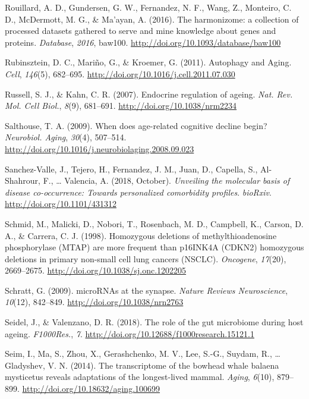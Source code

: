 \documentclass[12pt,twoside]{unicam}
\begin{document}
\begin{cslreferences}
\leavevmode\hypertarget{ref-Rouillard2016}{}%
Rouillard, A. D., Gundersen, G. W., Fernandez, N. F., Wang, Z., Monteiro, C. D., McDermott, M. G., \& Ma'ayan, A. (2016). The harmonizome: a collection of processed datasets gathered to serve and mine knowledge about genes and proteins. \emph{Database}, \emph{2016}, baw100. \url{http://doi.org/10.1093/database/baw100}

\leavevmode\hypertarget{ref-Rubinsztein2011}{}%
Rubinsztein, D. C., Mariño, G., \& Kroemer, G. (2011). Autophagy and Aging. \emph{Cell}, \emph{146}(5), 682--695. \url{http://doi.org/10.1016/j.cell.2011.07.030}

\leavevmode\hypertarget{ref-Russell2007}{}%
Russell, S. J., \& Kahn, C. R. (2007). Endocrine regulation of ageing. \emph{Nat. Rev. Mol. Cell Biol.}, \emph{8}(9), 681--691. \url{http://doi.org/10.1038/nrm2234}

\leavevmode\hypertarget{ref-Salthouse2009}{}%
Salthouse, T. A. (2009). When does age-related cognitive decline begin? \emph{Neurobiol. Aging}, \emph{30}(4), 507--514. \url{http://doi.org/10.1016/j.neurobiolaging.2008.09.023}

\leavevmode\hypertarget{ref-Sanchez-Valle2018}{}%
Sanchez-Valle, J., Tejero, H., Fernandez, J. M., Juan, D., Capella, S., Al-Shahrour, F., \ldots{} Valencia, A. (2018, October). \emph{Unveiling the molecular basis of disease co-occurrence: Towards personalized comorbidity profiles}. \emph{bioRxiv}. \url{http://doi.org/10.1101/431312}

\leavevmode\hypertarget{ref-Schmid1998}{}%
Schmid, M., Malicki, D., Nobori, T., Rosenbach, M. D., Campbell, K., Carson, D. A., \& Carrera, C. J. (1998). Homozygous deletions of methylthioadenosine phosphorylase (MTAP) are more frequent than p16INK4A (CDKN2) homozygous deletions in primary non-small cell lung cancers (NSCLC). \emph{Oncogene}, \emph{17}(20), 2669--2675. \url{http://doi.org/10.1038/sj.onc.1202205}

\leavevmode\hypertarget{ref-Schratt2009}{}%
Schratt, G. (2009). microRNAs at the synapse. \emph{Nature Reviews Neuroscience}, \emph{10}(12), 842--849. \url{http://doi.org/10.1038/nrn2763}

\leavevmode\hypertarget{ref-Seidel2018}{}%
Seidel, J., \& Valenzano, D. R. (2018). The role of the gut microbiome during host ageing. \emph{F1000Res.}, \emph{7}. \url{http://doi.org/10.12688/f1000research.15121.1}

\leavevmode\hypertarget{ref-Seim2014}{}%
Seim, I., Ma, S., Zhou, X., Gerashchenko, M. V., Lee, S.-G., Suydam, R., \ldots{} Gladyshev, V. N. (2014). The transcriptome of the bowhead whale balaena mysticetus reveals adaptations of the longest-lived mammal. \emph{Aging}, \emph{6}(10), 879--899. \url{http://doi.org/10.18632/aging.100699}


\end{cslreferences}
\end{document}
